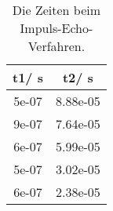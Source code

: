 \begin{table}\caption{Die Zeiten beim Impuls-Echo-Verfahren.}
\label{tabb}
\centering
{}
\begin{tabular}{S[]S[]} 
\toprule
{t1/ \si{\second}} & {t2/ \si{\second}}\\
\midrule
5e-07 & 8.88e-05\\
9e-07 & 7.64e-05\\
6e-07 & 5.99e-05\\
5e-07 & 3.02e-05\\
6e-07 & 2.38e-05\\
\bottomrule
\end{tabular}\end{table}
